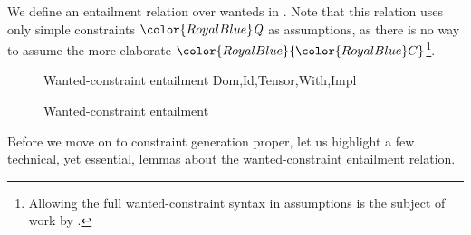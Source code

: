 \documentclass[acmsmall,usenames,dvipsnames,natbib=false,acmthm=false,screen]{acmart}
\newcommand{\constraintcolour}{\color{RoyalBlue}}
\newcommand{\constraintfont}[1]{{\constraintcolour#1}}
\theoremstyle{acmplain}
\theoremstyle{acmdefinition}
\begin{document}
We define an entailment relation over wanteds in .
Note that this relation uses only simple constraints $  \constraintfont{ \ottnt{Q} }  $ as assumptions, as
there is no way to assume the more elaborate $  \constraintfont{ \constraintfont{C} }  $\footnote{Allowing the full wanted-constraint syntax
in assumptions is the subject of work by \citet{quantified-constraints}.}.
\begin{figure}
  \maybesmall
  \centering
  \drules[C]{$ \constraintfont{ \ottnt{Q} }   \vdash   \constraintfont{ \constraintfont{C} } $} {Wanted-constraint entailment}
  {Dom,Id,Tensor,With,Impl}
  \caption{Wanted-constraint entailment}
  \label{fig:wanted:entailment}
\end{figure}

Before we move on to constraint generation proper, let us highlight a few
technical, yet essential, lemmas about the wanted-constraint
entailment relation.
\end{document}
